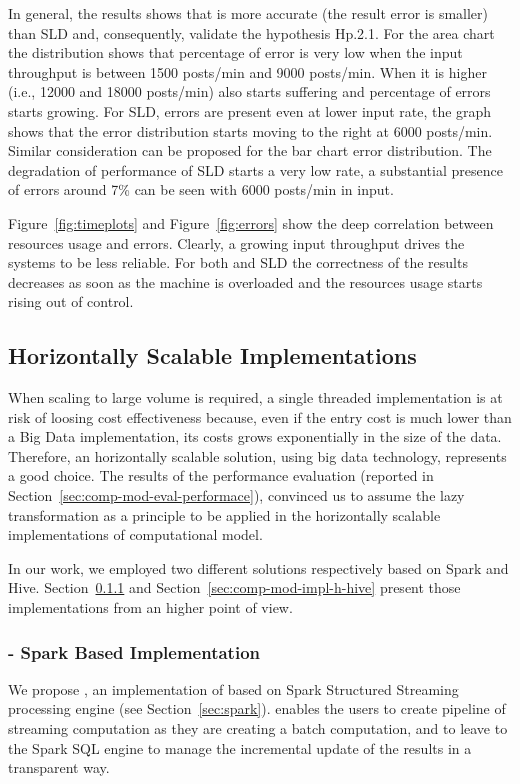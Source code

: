 In general, the results shows that \sti{} is more accurate (the result error is smaller) than SLD and, consequently, validate the hypothesis \textsf{Hp.2.1}. For the area chart the distribution shows that \sti{} percentage of error is very low when the input throughput is between 1500 posts/min and 9000 posts/min. When it is higher (i.e., 12000 and  18000 posts/min) also \sti{} starts suffering and percentage of errors starts growing. For SLD, errors are present even at lower input rate, the graph shows that the error distribution starts moving to the right at 6000 posts/min. Similar consideration can be proposed for the bar chart error distribution. The degradation of performance of SLD starts a very low rate, a substantial presence of errors around 7\% can be seen with 6000 posts/min in input.

Figure~\ref{fig:timeplots} and Figure~\ref{fig:errors} show the deep correlation between resources usage and errors. Clearly, a growing input throughput drives the systems to be less reliable. For both \sti{} and SLD the correctness of the results decreases as soon as the machine is overloaded and the resources usage starts rising out of control.

\subsection{Horizontally Scalable Implementations} \label{sec:comp-mod-impl-h}
When scaling to large volume is required, a single threaded implementation is at risk of loosing cost effectiveness because, even if the entry cost is much lower than a Big Data implementation, its costs grows exponentially in the size of the data. Therefore, an horizontally scalable solution, using big data technology, represents a good choice.
The results of the performance evaluation (reported in Section~\ref{sec:comp-mod-eval-performace}), convinced us to assume the \textsf{lazy transformation} as a principle to be applied in the horizontally scalable implementations of \river{} computational model.

In our work, we employed two different solutions respectively based on Spark and Hive.
Section~\ref{sec:comp-mod-impl-h-spark} and Section~\ref{sec:comp-mod-impl-h-hive} present those implementations from an higher point of view.

\subsubsection{\protect\sparkdi{} - Spark Based Implementation} \label{sec:comp-mod-impl-h-spark}
We propose \sparkdi{}, an implementation of \river{} based on Spark Structured Streaming processing engine (see Section~\ref{sec:spark}). 
\sparkdi{} enables the users to create pipeline of streaming computation as they are creating a batch computation, and to leave to the Spark SQL engine to manage the incremental update of the results in a transparent way.

